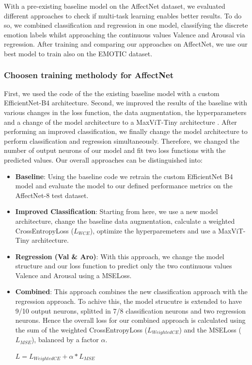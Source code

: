 \documentclass[conference]{IEEEtran}
\begin{document}
With a pre-existing baseline model on the AffectNet dataset, we evaluated different approaches to check if multi-task learning enables better results. To do so, we combined classification and regression in one model, classifying the discrete emotion labels whilst approaching the continuous values Valence and Arousal via regression. After training and comparing our approaches on AffectNet, we use our best model to train also on the EMOTIC dataset.

\subsubsection{Choosen training metholody for AffectNet}

First, we used the code of the the existing baseline model with a custom EfficientNet-B4 architecture. Second, we improved the results of the baseline with various changes in the loss function, the data augmentation, the hyperparameters and a change of the model architecture to a MaxViT-Tiny architecture \cite{tu2022maxvit}. After performing an improved classification, we finally change the model architecture to perform classification and regression simultaneously. Therefore, we changed the number of output neurons of our model and fit two loss functions with the predicted values. Our overall approaches can be distinguished into:

\begin{itemize}
\item \textbf{Baseline}: Using the baseline code we retrain the custom EfficientNet B4 model and evaluate the model to our defined performance metrics on the AffectNet-8 test dataset.
\item \textbf{Improved Classification}: Starting from here, we use a new model architecture, change the baseline data augmentation, calculate a  weighted CrossEntropyLoss ($L_{WCE}$), optimize the hyperparemeters and use a  MaxViT-Tiny architecture.
\item \textbf{Regression (Val \& Aro)}: With this approach, we change the model structure and our loss function to predict only the two continuous values Valence and Arousal using a MSELoss.
\item \textbf{Combined}: This approach combines the new classification approach with the regression approach. To achive this, the model strucutre is extended to have 9/10 output neurons, splitted in 7/8 classification neurons and two regression neurons. Hence the overall loss for our combined approach is calculated using the sum of the weighted CrossEntropyLoss ($L_{WeightedCE}$) and the MSELoss ($L_{MSE}$), balanced by a factor $\alpha$. 
\begin{center}
\begin{math}
L = L_{WeightedCE} + \alpha * L_{MSE}
\end{math}
\end{center}
\end{itemize}
\end{document}
